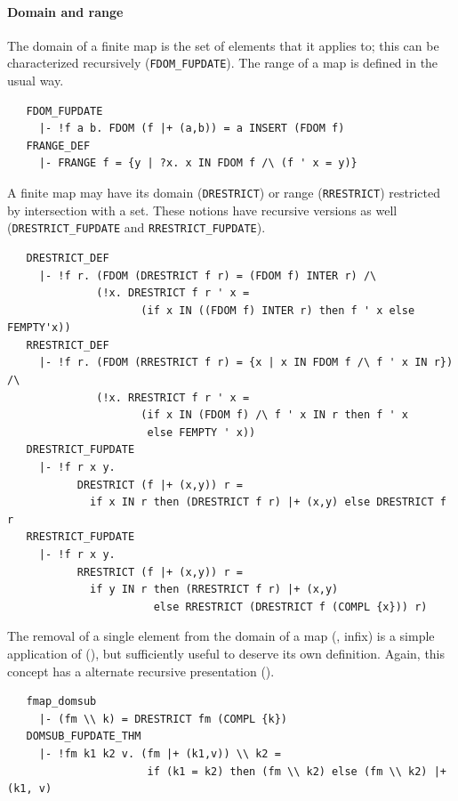 {\paragraph {Domain and range}

The domain of a finite map is the set of elements that it applies to;
this can be characterized recursively
({\small\verb+FDOM_FUPDATE+}). The range of a map is defined in the
usual way.
\begin{hol}
\begin{verbatim}
   FDOM_FUPDATE
     |- !f a b. FDOM (f |+ (a,b)) = a INSERT (FDOM f)
   FRANGE_DEF
     |- FRANGE f = {y | ?x. x IN FDOM f /\ (f ' x = y)}
\end{verbatim}
\end{hol}
%
A finite map may have its domain ({\small\verb+DRESTRICT+})
or range ({\small\verb+RRESTRICT+}) restricted by intersection with a
set. These notions have recursive versions as well
({\small\verb+DRESTRICT_FUPDATE+} and {\small\verb+RRESTRICT_FUPDATE+}).
%
\begin{hol}
\begin{verbatim}
   DRESTRICT_DEF
     |- !f r. (FDOM (DRESTRICT f r) = (FDOM f) INTER r) /\
              (!x. DRESTRICT f r ' x =
                     (if x IN ((FDOM f) INTER r) then f ' x else FEMPTY'x))
   RRESTRICT_DEF
     |- !f r. (FDOM (RRESTRICT f r) = {x | x IN FDOM f /\ f ' x IN r}) /\
              (!x. RRESTRICT f r ' x =
                     (if x IN (FDOM f) /\ f ' x IN r then f ' x
                      else FEMPTY ' x))
   DRESTRICT_FUPDATE
     |- !f r x y.
           DRESTRICT (f |+ (x,y)) r =
             if x IN r then (DRESTRICT f r) |+ (x,y) else DRESTRICT f r
   RRESTRICT_FUPDATE
     |- !f r x y.
           RRESTRICT (f |+ (x,y)) r =
             if y IN r then (RRESTRICT f r) |+ (x,y)
                       else RRESTRICT (DRESTRICT f (COMPL {x})) r)
\end{verbatim}
\end{hol}
The removal of a single element from the domain of a map
(\holtxt{\bs\bs}, infix) is a simple application of
(\holtxt{DRESTRICT}), but sufficiently useful to deserve its own
definition. Again, this concept has a alternate recursive presentation
(\holtxt{DOMSUB\_FUPDATE\_THM}).
%
\begin{hol}
\begin{verbatim}
   fmap_domsub
     |- (fm \\ k) = DRESTRICT fm (COMPL {k})
   DOMSUB_FUPDATE_THM
     |- !fm k1 k2 v. (fm |+ (k1,v)) \\ k2 =
                      if (k1 = k2) then (fm \\ k2) else (fm \\ k2) |+ (k1, v)
\end{verbatim}
\end{hol}

}
